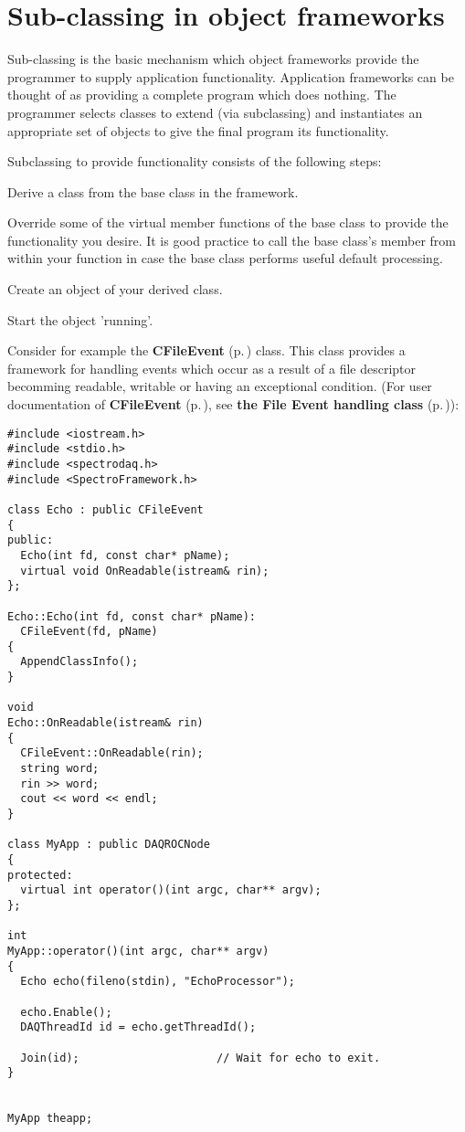 \section{Sub-classing in object frameworks}\label{Subclassing}


Sub-classing is the basic mechanism which object frameworks provide the  programmer to supply application functionality. Application frameworks can be thought of as providing a complete program which does nothing. The  programmer selects classes to extend (via subclassing) and instantiates an appropriate set of objects to give the final program its functionality.

Subclassing to provide functionality consists of the following steps:\begin{CompactItemize}
\item 
Derive a class from the base class in the framework.\item 
Override some of the virtual member functions of the base class to  provide the functionality you desire. It is good practice to call the base class's member from within your function in case the base class performs useful default processing.\item 
Create an object of your derived class.\item 
Start the object 'running'.\end{CompactItemize}
Consider for example the {\bf CFile\-Event} {\rm (p.\,\pageref{classCFileEvent})} class. This class provides a framework for handling events which occur as a result of a file descriptor becomming readable, writable or having an exceptional condition. (For user documentation of {\bf CFile\-Event} {\rm (p.\,\pageref{classCFileEvent})}, see {\bf the File Event handling class} {\rm (p.\,\pageref{FileEvents})}):



\footnotesize\begin{verbatim}#include <iostream.h>
#include <stdio.h>
#include <spectrodaq.h>
#include <SpectroFramework.h>

class Echo : public CFileEvent
{
public:
  Echo(int fd, const char* pName);
  virtual void OnReadable(istream& rin);
};

Echo::Echo(int fd, const char* pName):
  CFileEvent(fd, pName)
{
  AppendClassInfo();
}

void
Echo::OnReadable(istream& rin)
{
  CFileEvent::OnReadable(rin);
  string word;
  rin >> word;
  cout << word << endl;
}

class MyApp : public DAQROCNode
{
protected:
  virtual int operator()(int argc, char** argv);
};

int
MyApp::operator()(int argc, char** argv)
{
  Echo echo(fileno(stdin), "EchoProcessor");

  echo.Enable();
  DAQThreadId id = echo.getThreadId();

  Join(id);                     // Wait for echo to exit.
}


MyApp theapp;
\end{verbatim}\normalsize 


